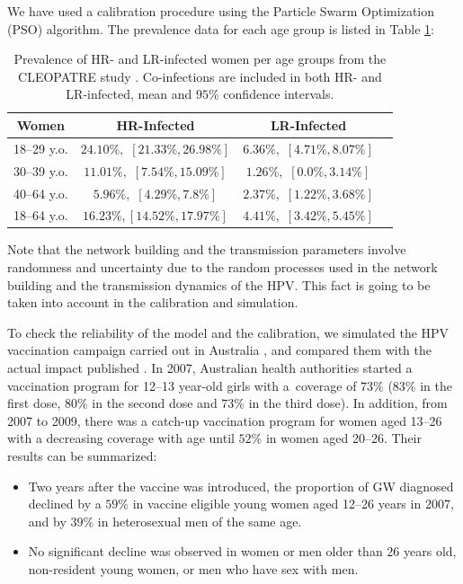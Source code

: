 We have used a calibration procedure using the Particle Swarm Optimization (PSO) algorithm. The prevalence data for each age group is listed in Table \ref{datos}:

\begin{table}[H]
	\centering
	\caption{Prevalence of HR- and LR-infected women per age groups from the 
CLEOPATRE study \protect\cite{CLEOPATRE}. Co-infections are included in both HR- and LR-infected, mean and $95\%$ confidence intervals.}
	\begin{tabular}{cccc}
		\toprule
		\textbf{Women} & \textbf{HR-Infected} & \textbf{LR-Infected} \\
		\midrule
		18--29 y.o. & $24.10\%,$ $[21.33\%, 26.98\%]$ & $6.36\%,$ $[4.71\%, 8.07\%]$ \\
		30--39 y.o. & $11.01\%,$ $[7.54\%, 15.09\%]$ & $1.26\%,$ $[0.0\%, 3.14\%]$ \\
		40--64 y.o. & $5.96\%,$ $[4.29\%, 7.8\%]$ & $2.37\%,$ $[1.22\%, 3.68\%]$ \\
		\midrule
		18--64 y.o. & $16.23\%,$$[14.52\%, 17.97\%]$ & $4.41\%,$ $[3.42\%, 5.45\%]$ \\
		\bottomrule
	\end{tabular}
	\label{datos}
\end{table}

Note that the network building and the transmission parameters involve randomness and uncertainty due to the random processes used in the network building and the transmission dynamics of the HPV. This fact is going to be taken into account in the  calibration and simulation.

To check the reliability of the model and the calibration, we simulated the HPV vaccination campaign carried out in Australia \cite{Ali}, and compared them with the actual impact published \cite{Ali}. In 2007, Australian health authorities started a vaccination program for 12--13 year-old girls with a~coverage of $73\%$ ($83\%$ in the first dose, $80\%$ in the second dose and $73\%$ in the third dose). In addition, from 2007 to 2009, there was a catch-up vaccination program for women aged 13--26 with a decreasing coverage with age until $52\%$ in women aged 20--26. Their results can be summarized:

\begin{itemize}[leftmargin=*,labelsep=5mm]
\item Two years after the vaccine was introduced, the proportion of GW diagnosed declined by a $59\%$ in vaccine eligible young women aged 12--26 years in $2007$, and by $39\%$ in heterosexual men of the same age.
\item No significant decline was observed in women or men older than $26$ years old, non-resident young women, or men who have sex with men.
\end{itemize}

